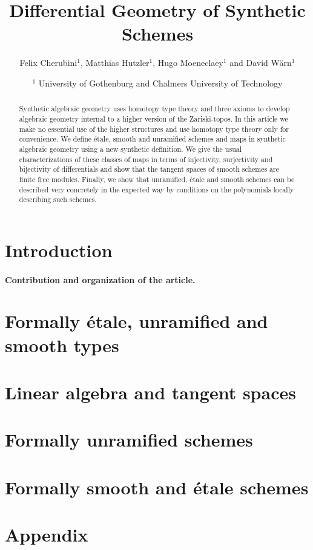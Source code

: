 \documentclass{../util/zariski}
\title{Differential Geometry of Synthetic Schemes}
\author{Felix Cherubini$^1$, Matthias Hutzler$^1$, Hugo Moeneclaey$^1$ and David Wärn$^1$}
\date{$^1$ University of Gothenburg and Chalmers University of Technology }
\begin{document}
\maketitle

\begin{abstract}
  Synthetic algebraic geometry uses homotopy type theory and three axioms to develop algebraic geometry internal to a higher version of the Zariski-topos.
  In this article we make no essential use of the higher structures and use homotopy type theory only for convenience.
  We define étale, smooth and unramified schemes and maps in synthetic algebraic geometry using a new synthetic definition.
  We give the usual characterizations of these classes of maps in terms of injectivity, surjectivity and bijectivity of differentials
  and show that the tangent spaces of smooth schemes are finite free modules.
  Finally, we show that unramified, étale and smooth schemes can be described very concretely in the expected way by conditions on the polynomials locally describing such schemes.  
\end{abstract}

\tableofcontents

\section*{Introduction}

\paragraph{Contribution and organization of the article. }


\section{Formally étale, unramified and smooth types}


\section{Linear algebra and tangent spaces}


\section{Formally unramified schemes}


\section{Formally smooth and étale schemes}


\pagebreak
\appendix
\section*{Appendix}


\printindex

\printbibliography
\end{document}
